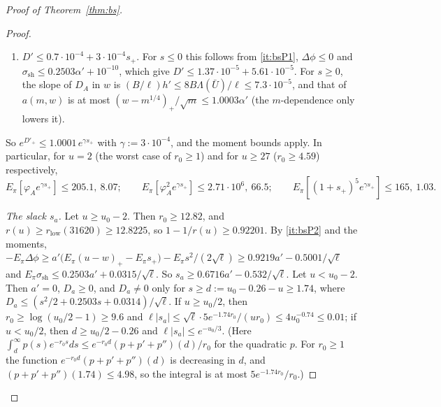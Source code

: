 \begin{proof}[Proof of Theorem~\ref{thm:bs}]
\begin{proof}
\begin{enumerate}[label=(P\arabic*)]
\[    \le0.2503\Big(a'+\frac{s_+}{\sqrt\ell}\Big)+\frac{0.0314}{\sqrt\ell}.
  \]
  Hence, using $-|s|a'\le\Delta\phi\le0$ for $s\le0$ (as $\phi$ is non-decreasing) and the displayed bound for $s\ge0$,
  $|D_a|\le(|s|+0.2503)a'+q(s)/\sqrt\ell$ and $(D_a)_+\le(s_++0.2503)a'+(q(s)+0.5)/\sqrt\ell$, with
  $q(s):=s_+^2/2+0.2503s_++0.0314$.
\item\label{it:bsP3} $D'\le0.7\cdot10^{-4}+3\cdot10^{-4}s_+$. For $s\le0$ this follows from \ref{it:bsP1}, $\Delta\phi\le0$ and
  $\sigma_{\mathrm{sh}}\le0.2503\alpha'+10^{-10}$, which give $D'\le1.37\cdot10^{-5}+5.61\cdot10^{-5}$. For $s\ge0$, the slope of $D_A$ in $w$ is $(B/\ell)h'\le8B\Lambda(\bar U)/\ell\le7.3\cdot10^{-5}$,
  and that of $a(m,w)$ is at most $(w-m^{1/4})_+/\sqrt m\le1.0003\alpha'$ (the $m$-dependence only lowers it).
\end{enumerate}
So $e^{D'_+}\le1.0001\,e^{\gamma s_+}$ with $\gamma:=3\cdot10^{-4}$, and the moment bounds apply. In particular, for $u=2$ (the
worst case of $r_0\ge1$) and for $u\ge27$ ($r_0\ge4.59$) respectively,
\[
  E_\pi[\varphi_Ae^{\gamma s_+}]\le205.1,\ 8.07;\qquad E_\pi[\varphi_A^2e^{\gamma s_+}]\le2.71\cdot10^6,\ 66.5;\qquad
  E_\pi[(1+s_+)^5e^{\gamma s_+}]\le165,\ 1.03 .
\]

\emph{The slack $s_a$.} Let $u\ge u_0-2$. Then $r_0\ge12.82$, and $r(u)\ge r_{\mathrm{low}}(31620)\ge12.8225$, so
$1-1/r(u)\ge0.92201$. By \ref{it:bsP2} and the moments,
$-E_\pi\Delta\phi\ge a'\big(E_\pi(u-w)_+-E_\pi s_+\big)-E_\pi s^2/(2\sqrt\ell)\ge0.9219a'-0.5001/\sqrt\ell$ and
$E_\pi\sigma_{\mathrm{sh}}\le0.2503a'+0.0315/\sqrt\ell$. So $s_a\ge0.6716a'-0.532/\sqrt\ell$. Let $u<u_0-2$. Then $a'=0$,
$D_a\ge0$, and $D_a\ne0$ only for $s\ge d:=u_0-0.26-u\ge1.74$, where $D_a\le(s^2/2+0.2503s+0.0314)/\sqrt\ell$. If
$u\ge u_0/2$, then $r_0\ge\log(u_0/2-1)\ge9.6$ and $\ell|s_a|\le\sqrt\ell\cdot5e^{-1.74r_0}/(ur_0)\le4u_0^{-0.74}\le0.01$; if
$u<u_0/2$, then $d\ge u_0/2-0.26$ and $\ell|s_a|\le e^{-u_0/3}$. (Here
$\int_d^\infty p(s)e^{-r_0s}ds\le e^{-r_0d}(p+p'+p'')(d)/r_0$ for the quadratic $p$. For $r_0\ge1$ the function
$e^{-r_0d}(p+p'+p'')(d)$ is decreasing in $d$, and $(p+p'+p'')(1.74)\le4.98$, so the integral is at most $5e^{-1.74r_0}/r_0$.)


\end{proof}
\end{proof}
